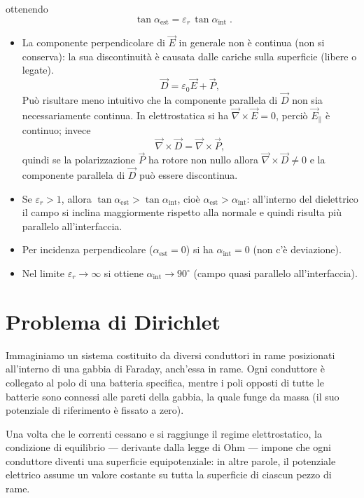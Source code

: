 \documentclass{book}
\begin{document}
ottenendo
\[
\boxed{\;\tan\alpha_{\mathrm{est}}=\varepsilon_r\,\tan\alpha_{\mathrm{int}}\; }.
\]


\begin{itemize}
\item{La componente perpendicolare di \(\vec{E}\)  in generale non è continua (non si conserva): la sua discontinuità è causata dalle cariche sulla superficie (libere o legate). 
\[
\vec{D}=\varepsilon_0\vec{E}+\vec{P},
\]
Può risultare meno intuitivo che la componente parallela di \(\vec{D}\) non sia necessariamente continua. In elettrostatica si ha \(\vec{\nabla}\times\vec{E}=0\), perciò \(\vec{E}_{\parallel}\) è continuo; invece
\[
\vec{\nabla}\times\vec{D}=\vec{\nabla}\times\vec{P},
\]
quindi se la polarizzazione \(\vec{P}\) ha rotore non nullo allora \(\vec{\nabla}\times\vec{D}\neq 0\) e la componente parallela di \(\vec{D}\) può essere discontinua.}

  \item Se $\varepsilon_r>1$, allora $\tan\alpha_{\text{est}}>\tan\alpha_{\text{int}}$, cioè $\alpha_{\text{est}}>\alpha_{\text{int}}$: all'interno del dielettrico il campo si inclina maggiormente rispetto alla normale e quindi risulta più parallelo all'interfaccia.
  \item Per incidenza perpendicolare ($\alpha_{\text{est}}=0$) si ha $\alpha_{\text{int}}=0$ (non c'è deviazione).
  \item Nel limite $\varepsilon_r\to\infty$ si ottiene $\alpha_{\text{int}}\to 90^\circ$ (campo quasi parallelo all'interfaccia).
\end{itemize}


\section{Problema di Dirichlet}

Immaginiamo un sistema costituito da diversi conduttori in rame posizionati all'interno di una gabbia di Faraday, anch'essa in rame. Ogni conduttore è collegato al polo di una batteria specifica, mentre i poli opposti di tutte le batterie sono connessi alle pareti della gabbia, la quale funge da massa (il suo potenziale di riferimento è fissato a zero).

Una volta che le correnti cessano e si raggiunge il regime elettrostatico, la condizione di equilibrio — derivante dalla legge di Ohm — impone che ogni conduttore diventi una superficie equipotenziale: in altre parole, il potenziale elettrico assume un valore costante su tutta la superficie di ciascun pezzo di rame.
\end{document}
